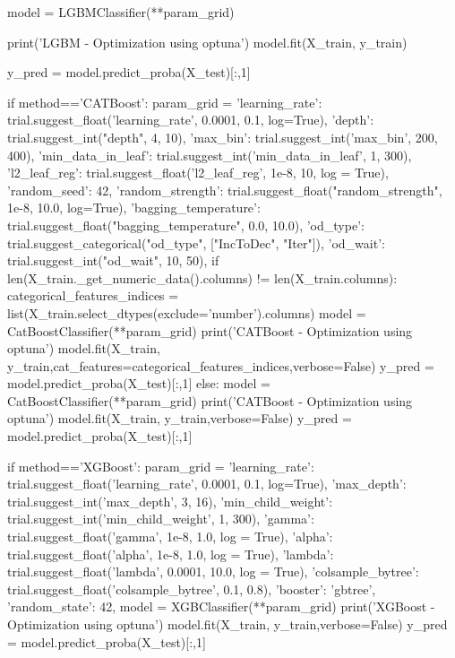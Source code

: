 \begin{codigo}[caption={Código implementado para o Tuning com o Optuna.}, label={codigo:im:tuning}, language=Python, breaklines=true]
{                     }
        model = LGBMClassifier(**param_grid)

        print('LGBM - Optimization using optuna')
        model.fit(X_train, y_train)
        
        y_pred = model.predict_proba(X_test)[:,1]

    if method=='CATBoost':
        param_grid = {'learning_rate': trial.suggest_float('learning_rate', 0.0001, 0.1, log=True),
                      'depth': trial.suggest_int("depth", 4, 10),
                      'max_bin': trial.suggest_int('max_bin', 200, 400),
                      'min_data_in_leaf': trial.suggest_int('min_data_in_leaf', 1, 300),
                      'l2_leaf_reg': trial.suggest_float('l2_leaf_reg', 1e-8, 10, log = True),
                      'random_seed': 42,
                      'random_strength': trial.suggest_float("random_strength", 1e-8, 10.0, log=True),
                      'bagging_temperature': trial.suggest_float("bagging_temperature", 0.0, 10.0),
                      'od_type': trial.suggest_categorical("od_type", ["IncToDec", "Iter"]),
                      'od_wait': trial.suggest_int("od_wait", 10, 50),
                     }
        if len(X_train._get_numeric_data().columns) != len(X_train.columns):
            categorical_features_indices = list(X_train.select_dtypes(exclude='number').columns)
            model = CatBoostClassifier(**param_grid)
            print('CATBoost - Optimization using optuna')
            model.fit(X_train, y_train,cat_features=categorical_features_indices,verbose=False)
            y_pred = model.predict_proba(X_test)[:,1]
        else:
            model = CatBoostClassifier(**param_grid)
            print('CATBoost - Optimization using optuna')
            model.fit(X_train, y_train,verbose=False)
            y_pred = model.predict_proba(X_test)[:,1]
        
    if method=='XGBoost':
        param_grid = {'learning_rate': trial.suggest_float('learning_rate', 0.0001, 0.1, log=True),
                      'max_depth': trial.suggest_int('max_depth', 3, 16),
                      'min_child_weight': trial.suggest_int('min_child_weight', 1, 300),
                      'gamma': trial.suggest_float('gamma', 1e-8, 1.0, log = True),
                      'alpha': trial.suggest_float('alpha', 1e-8, 1.0, log = True),
                      'lambda': trial.suggest_float('lambda', 0.0001, 10.0, log = True),
                      'colsample_bytree': trial.suggest_float('colsample_bytree', 0.1, 0.8),
                      'booster': 'gbtree',
                      'random_state': 42,
                     }
        model = XGBClassifier(**param_grid)
        print('XGBoost - Optimization using optuna')
        model.fit(X_train, y_train,verbose=False)
        y_pred = model.predict_proba(X_test)[:,1]
    

\end{codigo}
